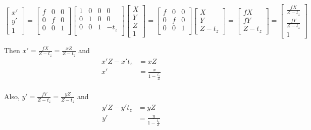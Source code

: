 \documentclass{article}
\begin{document}
$$
  \begin{bmatrix}
    x' \\ y' \\ 1
  \end{bmatrix} = \begin{bmatrix}
    f & 0 & 0 \\ 0 & f & 0 \\ 0 & 0 & 1 \\
  \end{bmatrix}\begin{bmatrix}
    1 & 0 & 0 & 0 \\
    0 & 1 & 0 & 0 \\
    0 & 0 & 1 & -t_z \\
  \end{bmatrix}\begin{bmatrix}
    X \\ Y \\ Z \\ 1
  \end{bmatrix} = \begin{bmatrix}
    f & 0 & 0 \\
    0 & f & 0 \\
    0 & 0 & 1 \\
  \end{bmatrix}\begin{bmatrix}
    X \\ Y \\ Z - t_z
  \end{bmatrix} = \begin{bmatrix}
    fX \\ fY \\ Z - t_z
  \end{bmatrix} = \begin{bmatrix}
    \frac{fX}{Z-t_z} \\ \frac{fY}{Z-t_z} \\ 1
  \end{bmatrix} 
$$

Then $
  x' = \frac{fX}{Z-t_z} = \frac{xZ}{Z-t_z} 
$ and $$
\begin{aligned}
  x'Z-x't_z & = xZ \\
  x' & = \frac{x}{1-\frac{t_z}{Z}} \\
\end{aligned}
$$

Also, $y' = \frac{fY}{Z-t_z} = \frac{yZ}{Z-t_z}$ and $$
\begin{aligned}
  y'Z-y't_z & = yZ \\
  y' & = \frac{y}{1-\frac{t_z}{Z}} \\
\end{aligned}
$$
\end{document}
